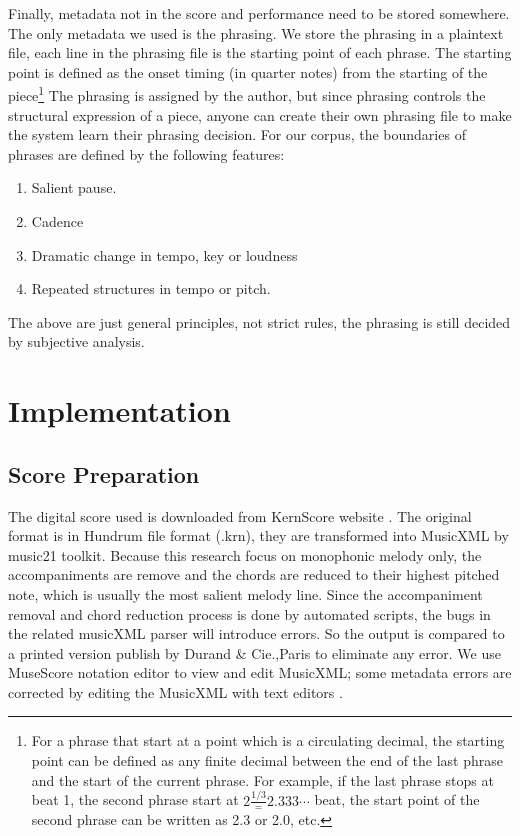 Finally, metadata not in the score and performance need to be stored somewhere. The only metadata we used is the phrasing. We store the phrasing in a plaintext file, each line in the phrasing file is the starting point of each phrase. The starting point is defined as the onset timing (in quarter notes) from the starting of the piece\footnote{For a phrase that start at a point which is a circulating decimal, the starting point can be defined as any finite decimal between the end of the last phrase and the start of the current phrase. For example, if the last phrase stops at beat 1, the second phrase start at $2\frac{1/3}=2.333\cdots$ beat, the start point of the second phrase can be written as 2.3 or 2.0, etc.} The phrasing is assigned by the author, but since phrasing controls the structural expression of a piece, anyone can create their own phrasing file to make the system learn their phrasing decision.  For our corpus, the boundaries of phrases are defined by the following features:
\begin{enumerate}
   \item Salient pause.
   \item Cadence
   \item Dramatic change in tempo, key or loudness
   \item Repeated structures in tempo or pitch.
\end{enumerate}
The above are just general principles, not strict rules, the phrasing is still decided by subjective analysis.




 
\section{Implementation}

\subsection{Score Preparation}

The digital score used is downloaded from KernScore website \cite{KernScores}. The original format is in Hundrum file format (.krn), they are transformed into MusicXML by music21 toolkit. Because this research focus on monophonic melody only, the accompaniments are remove and the chords are reduced to their highest pitched note, which is usually the most salient melody line. Since the accompaniment removal and chord reduction process is done by automated scripts, the bugs in the related musicXML parser will introduce errors. So the output is compared to a printed version publish by Durand \& Cie.,Paris \cite{Clementi1915} to eliminate any error. We use MuseScore notation editor to view and edit MusicXML; some metadata errors are corrected by editing the MusicXML with text editors .

